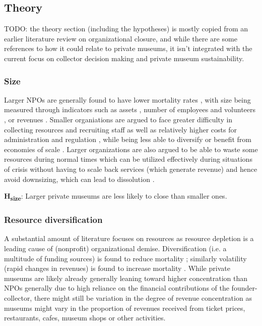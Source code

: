 \documentclass[11pt]{article}
\begin{document}
\subsection*{Theory}


TODO: the theory section (including the hypotheses) is mostly copied from an earlier literature review on organizational closure, and while there are some references to how it could relate to private museums, it isn't integrated with the current focus on collector decision making and private museum sustainability. 

\subsubsection*{Size}


Larger NPOs are generally found to have lower mortality rates \parencite{Hager_1999_demise,Duckles_Hager_Galaskiewicz_2005_close}, with size being measured through indicators such as assets \parencite{Lu_Shon_Zhang_2019_dissolution}, number of employees \parencite{Bielefeld_1994_survival} and volunteers \parencite{Fernandez_2007_dissolution}, or revenues \parencite{Searing_2020_zombies}.
Smaller organiations are argued to face greater difficulty in collecting resources and recruiting staff as well as relatively higher costs for administration and regulation \parencite{Helmig_Ingerfurth_Pinz_2013_nonprofit}, while being less able to diversify or benefit from economies of scale \parencite{Hager_1999_demise}. 
Larger organizations are also argued to be able to waste some resources during normal times which can be utilized effectively during situations of crisis without having to scale back services (which generate revenue) \parencite{Hager_2001_vulnerability} and hence avoid downsizing, which can lead to dissolution \parencite{Duckles_Hager_Galaskiewicz_2005_close,Bielefeld_1994_survival}. 

\bigbreak
\noindent
\textbf{H\textsubscript{size}}: Larger private museums are less likely to close than smaller ones.




\subsubsection*{Resource diversification}


A substantial amount of literature focuses on resources as resource depletion is a leading cause of (nonprofit) organizational demise. 
Diversification (i.e. a multitude of funding sources) is found to reduce mortality \parencite{Fernandez_2007_dissolution,Bielefeld_1994_survival,Hager_2001_vulnerability,Lu_Shon_Zhang_2019_dissolution}; similarly volatility (rapid changes in revenues) is found to increase mortality \parencite{Mayer_2022_slimmer}. 
While private museums are likely already generally leaning toward higher concentration than NPOs generally due to high reliance on the financial contributions of the founder-collector, there might still be variation in the degree of revenue concentration as museums might vary in the proportion of revenues received from ticket prices, restaurants, cafes, museum shops or other activities. 
\end{document}
